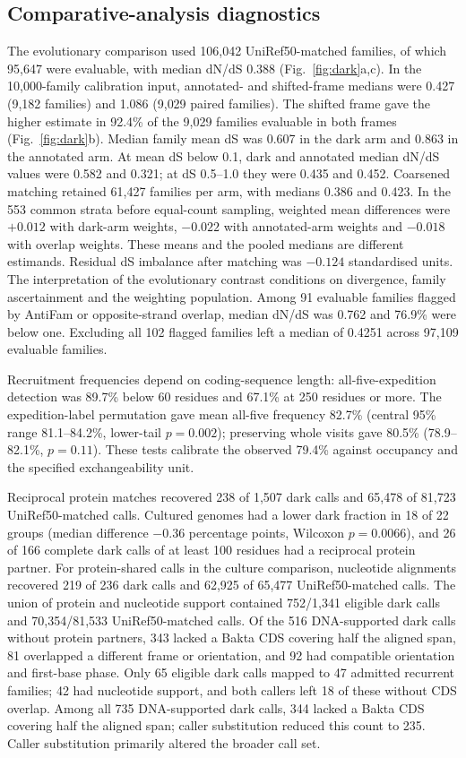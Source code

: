\subsection*{Comparative-analysis diagnostics}
The evolutionary comparison used 106{,}042 UniRef50-matched families, of which 95{,}647 were evaluable, with median dN/dS 0.388 (Fig.~\ref{fig:dark}a,c). In the 10{,}000-family calibration input, annotated- and shifted-frame medians were 0.427 (9{,}182 families) and 1.086 (9{,}029 paired families). The shifted frame gave the higher estimate in 92.4\% of the 9{,}029 families evaluable in both frames (Fig.~\ref{fig:dark}b). Median family mean dS was 0.607 in the dark arm and 0.863 in the annotated arm. At mean dS below 0.1, dark and annotated median dN/dS values were 0.582 and 0.321; at dS 0.5--1.0 they were 0.435 and 0.452. Coarsened matching retained 61{,}427 families per arm, with medians 0.386 and 0.423. In the 553 common strata before equal-count sampling, weighted mean differences were $+0.012$ with dark-arm weights, $-0.022$ with annotated-arm weights and $-0.018$ with overlap weights. These means and the pooled medians are different estimands. Residual dS imbalance after matching was $-0.124$ standardised units. The interpretation of the evolutionary contrast conditions on divergence, family ascertainment and the weighting population. Among 91 evaluable families flagged by AntiFam or opposite-strand overlap, median dN/dS was 0.762 and 76.9\% were below one. Excluding all 102 flagged families left a median of 0.4251 across 97{,}109 evaluable families.

Recruitment frequencies depend on coding-sequence length: all-five-expedition detection was 89.7\% below 60 residues and 67.1\% at 250 residues or more. The expedition-label permutation gave mean all-five frequency 82.7\% (central 95\% range 81.1--84.2\%, lower-tail $p=0.002$); preserving whole visits gave 80.5\% (78.9--82.1\%, $p=0.11$). These tests calibrate the observed 79.4\% against occupancy and the specified exchangeability unit.

Reciprocal protein matches recovered 238 of 1{,}507 dark calls and 65{,}478 of 81{,}723 UniRef50-matched calls. Cultured genomes had a lower dark fraction in 18 of 22 groups (median difference $-0.36$ percentage points, Wilcoxon $p=0.0066$), and 26 of 166 complete dark calls of at least 100 residues had a reciprocal protein partner. For protein-shared calls in the culture comparison, nucleotide alignments recovered 219 of 236 dark calls and 62{,}925 of 65{,}477 UniRef50-matched calls. The union of protein and nucleotide support contained 752/1{,}341 eligible dark calls and 70{,}354/81{,}533 UniRef50-matched calls. Of the 516 DNA-supported dark calls without protein partners, 343 lacked a Bakta CDS covering half the aligned span, 81 overlapped a different frame or orientation, and 92 had compatible orientation and first-base phase. Only 65 eligible dark calls mapped to 47 admitted recurrent families; 42 had nucleotide support, and both callers left 18 of these without CDS overlap. Among all 735 DNA-supported dark calls, 344 lacked a Bakta CDS covering half the aligned span; caller substitution reduced this count to 235. Caller substitution primarily altered the broader call set.


